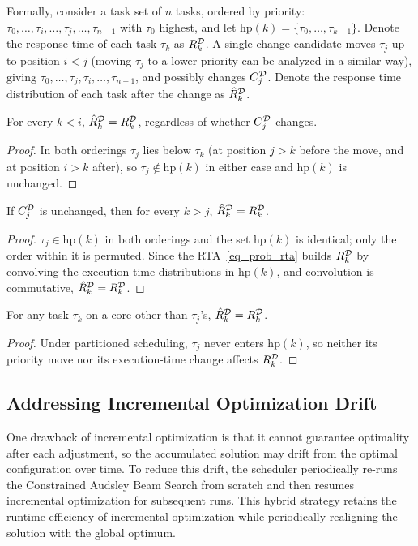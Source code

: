     Formally, consider a task set of $n$ tasks, ordered by priority: $\tau_0,\dots,\tau_i,\dots,\tau_j,\dots,\tau_{n-1}$ with $\tau_0$ highest, and let $\text{hp}(k)=\{\tau_0,\dots,\tau_{k-1}\}$.
    Denote the response time of each task $\tau_k$ as $R_{k}^{\mathcal{D}}$.
    A single-change candidate moves $\tau_j$ up to position $i<j$ (moving $\tau_j$ to a lower priority can be analyzed in a similar way), 
    giving $\tau_0,\dots,\tau_j,\tau_i,\dots,\tau_{n-1}$, and possibly changes $C_{j}^{\mathcal{D}}$.
    Denote the response time distribution of each task after the change as $\hat{R}_{k}^{\mathcal{D}}$.

    \begin{lemma}
    \label{lem:rta_hp}
    For every $k<i$, $\hat{R}_{k}^{\mathcal{D}}=R_{k}^{\mathcal{D}}$, regardless of whether $C_{j}^{\mathcal{D}}$ changes.
    \end{lemma}
    \begin{proof}
    In both orderings $\tau_j$ lies below $\tau_k$ (at position $j>k$ before the move, and at position $i>k$ after), so $\tau_j\notin\text{hp}(k)$ in either case and $\text{hp}(k)$ is unchanged.
    \end{proof}

    \begin{lemma}
    \label{lem:rta_lp_pure_move}
    If $C_{j}^{\mathcal{D}}$ is unchanged, then for every $k>j$, $\hat{R}_{k}^{\mathcal{D}}=R_{k}^{\mathcal{D}}$.
    \end{lemma}
    \begin{proof}
    $\tau_j\in\text{hp}(k)$ in both orderings and the set $\text{hp}(k)$ is identical; only the order within it is permuted. Since the RTA~\eqref{eq_prob_rta} builds $R_{k}^{\mathcal{D}}$ by convolving the execution-time distributions in $\text{hp}(k)$, and convolution is commutative, $\hat{R}_{k}^{\mathcal{D}}=R_{k}^{\mathcal{D}}$.
    \end{proof}

    \begin{lemma}
    \label{lem:rta_cross_core}
    For any task $\tau_k$ on a core other than $\tau_j$'s, $\hat{R}_{k}^{\mathcal{D}}=R_{k}^{\mathcal{D}}$.
    \end{lemma}
    \begin{proof}
    Under partitioned scheduling, $\tau_j$ never enters $\text{hp}(k)$, so neither its priority move nor its execution-time change affects $R_{k}^{\mathcal{D}}$.
    \end{proof}

    \subsection{Addressing Incremental Optimization Drift}
    \label{sec: drift}
    One drawback of incremental optimization is that it cannot guarantee optimality after each adjustment, so the accumulated solution may drift from the optimal configuration over time.
    To reduce this drift, the scheduler periodically re-runs the Constrained Audsley Beam Search from scratch and then resumes incremental optimization for subsequent runs.
    This hybrid strategy retains the runtime efficiency of incremental optimization while periodically realigning the solution with the global optimum.

